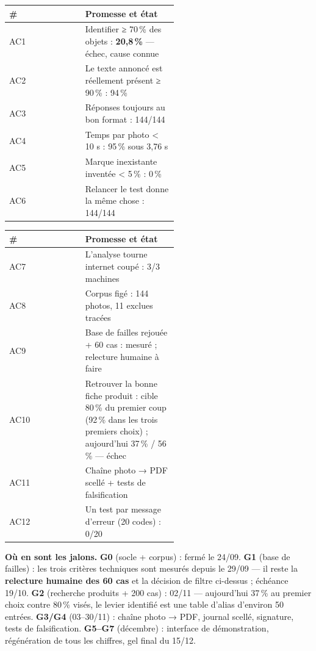 \documentclass[10pt,a4paper]{article}
\newcommand{\OK}{\textcolor{ok}{\faCheckCircle}}
\newcommand{\KO}{\textcolor{fail}{\faTimesCircle}}
\newcommand{\PART}{\textcolor{warn}{\faClock}}
\newcommand{\TODO}{\textcolor{todo}{\faHourglassHalf}}
\begin{document}
\begin{center}
\begin{minipage}[t]{0.49\linewidth}
\footnotesize\sffamily
\begin{tabular}{@{}llp{0.55\linewidth}@{}}
\toprule
\textbf{\#} & & \textbf{Promesse et état}\\
\midrule
AC1 & \KO & Identifier ≥ 70\,\% des objets : \textbf{20,8\,\%} — échec, cause connue\\
AC2 & \OK & Le texte annoncé est réellement présent ≥ 90\,\% : 94\,\%\\
AC3 & \OK & Réponses toujours au bon format : 144/144\\
AC4 & \OK & Temps par photo < 10 s : 95\,\% sous 3,76 s\\
AC5 & \OK & Marque inexistante inventée < 5\,\% : 0\,\%\\
AC6 & \OK & Relancer le test donne la même chose : 144/144\\
\bottomrule
\end{tabular}
\end{minipage}\hfill
\begin{minipage}[t]{0.49\linewidth}
\footnotesize\sffamily
\begin{tabular}{@{}llp{0.55\linewidth}@{}}
\toprule
\textbf{\#} & & \textbf{Promesse et état}\\
\midrule
AC7 & \OK & L'analyse tourne internet coupé : 3/3 machines\\
AC8 & \OK & Corpus figé : 144 photos, 11 exclues tracées\\
AC9 & \PART & Base de failles rejouée + 60 cas : mesuré ; relecture humaine à faire\\
AC10 & \KO & Retrouver la bonne fiche produit : cible 80\,\% du premier coup (92\,\% dans les trois premiers choix) ; aujourd'hui 37\,\% / 56\,\% — échec\\
AC11 & \TODO & Chaîne photo → PDF scellé + tests de falsification\\
AC12 & \PART & Un test par message d'erreur (20 codes) : 0/20\\
\bottomrule
\end{tabular}
\end{minipage}
\end{center}

\noindent\textbf{Où en sont les jalons.} \textbf{G0} (socle + corpus) : fermé le 24/09.
\textbf{G1} (base de failles) : les trois critères techniques sont mesurés depuis le 29/09 — il
reste la \textbf{relecture humaine des 60 cas} et la décision de filtre ci-dessus ; échéance
19/10. \textbf{G2} (recherche produits + 200 cas) : 02/11 — aujourd'hui 37\,\% au premier choix
contre 80\,\% visés, le levier identifié est une table d'alias d'environ 50 entrées. \textbf{G3/G4}
(03–30/11) : chaîne photo → PDF, journal scellé, signature, tests de falsification.
\textbf{G5–G7} (décembre) : interface de démonstration, régénération de tous les chiffres, gel
final du 15/12.
\end{document}
